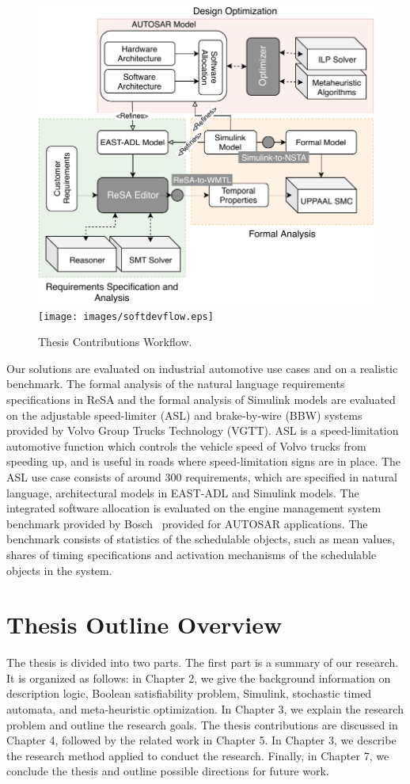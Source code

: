 \begin{figure}
	\centering
	\ifpdf
	\includegraphics[width=\linewidth]{images/softdevflow}
	\else
	\texttt{[image: images/softdevflow.eps]}
	\fi
	\caption{Thesis Contributions Workflow.} 
\end{figure}

Our solutions are evaluated on industrial automotive use cases and on a realistic benchmark. The formal analysis of the natural language requirements specifications in ReSA and the formal analysis of Simulink models are evaluated on the adjustable speed-limiter (ASL) and brake-by-wire (BBW) systems provided by Volvo Group Trucks Technology (VGTT). ASL is a speed-limitation automotive function which controls the vehicle speed of Volvo trucks from speeding up, and is useful in roads where speed-limitation signs are in place. The ASL use case consists of around 300 requirements, which are specified in natural language, architectural models in EAST-ADL and Simulink models. The integrated software allocation is evaluated on the engine management system benchmark provided by Bosch~\cite{} provided for AUTOSAR applications. The benchmark consists of statistics of the schedulable objects, such as mean values, shares of timing specifications and activation mechanisms of the schedulable objects in the system.

\section{Thesis Outline Overview}
The thesis is divided into two parts. The first part is a summary of our research. It is organized as follows: in Chapter 2, we give the background information on description logic, Boolean satisfiability problem, Simulink, stochastic timed automata, and meta-heuristic optimization. In Chapter 3, we explain the research problem and outline the research goals. The thesis contributions are discussed in Chapter 4, followed by the related work in Chapter 5. In Chapter 3, we describe the research method applied to conduct the research. Finally, in Chapter 7, we conclude the thesis and outline possible directions for future work.

